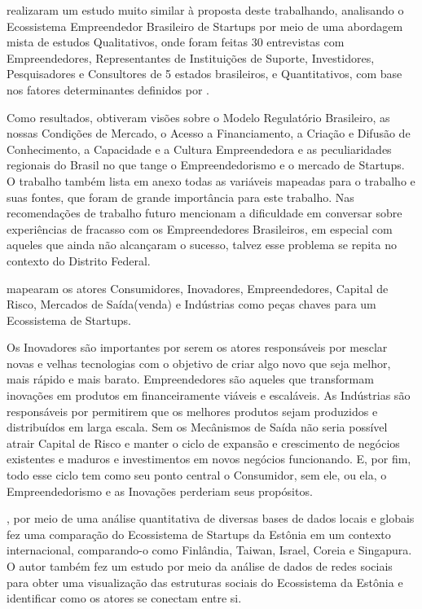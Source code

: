  realizaram um estudo muito similar à proposta deste trabalhando, analisando o Ecossistema Empreendedor Brasileiro de Startups por meio de uma abordagem mista de estudos Qualitativos, onde foram feitas 30 entrevistas com Empreendedores, Representantes de Instituições de Suporte, Investidores, Pesquisadores e Consultores de 5 estados brasileiros, e Quantitativos, com base nos fatores determinantes definidos por . 

Como resultados, obtiveram visões sobre o Modelo Regulatório Brasileiro, as nossas Condições de Mercado, o Acesso a Financiamento, a Criação e Difusão de Conhecimento, a Capacidade e a Cultura Empreendedora e as peculiaridades regionais do Brasil no que tange o Empreendedorismo e o mercado de Startups. O trabalho também lista em anexo todas as variáveis mapeadas para o trabalho e suas fontes, que foram de grande importância para este trabalho. Nas recomendações de trabalho futuro mencionam a dificuldade em conversar sobre experiências de fracasso com os Empreendedores Brasileiros, em especial com aqueles que ainda não alcançaram o sucesso, talvez esse problema se repita no contexto do Distrito Federal.

 mapearam os atores Consumidores, Inovadores, Empreendedores, Capital de Risco, Mercados de Saída(venda) e Indústrias como peças chaves para um Ecossistema de Startups. 

Os Inovadores são importantes por serem os atores responsáveis por mesclar novas e velhas tecnologias com o objetivo de criar algo novo que seja melhor, mais rápido e mais barato. Empreendedores são aqueles que transformam inovações em produtos em financeiramente viáveis e escaláveis. As Indústrias são responsáveis por permitirem que os melhores produtos sejam produzidos e distribuídos em larga escala. Sem os Mecânismos de Saída não seria possível atrair Capital de Risco e manter o ciclo de expansão e crescimento de negócios existentes e maduros e investimentos em novos negócios funcionando. E, por fim, todo esse ciclo tem como seu ponto central o Consumidor, sem ele, ou ela, o Empreendedorismo e as Inovações perderiam seus propósitos.

, por meio de uma análise quantitativa de diversas bases de dados locais e globais fez uma comparação do Ecossistema de Startups da Estônia em um contexto internacional, comparando-o como Finlândia, Taiwan, Israel, Coreia e Singapura. O autor também fez um estudo por meio da análise de dados de redes sociais para obter uma visualização das estruturas sociais do Ecossistema da Estônia e identificar como os atores se conectam entre si.

